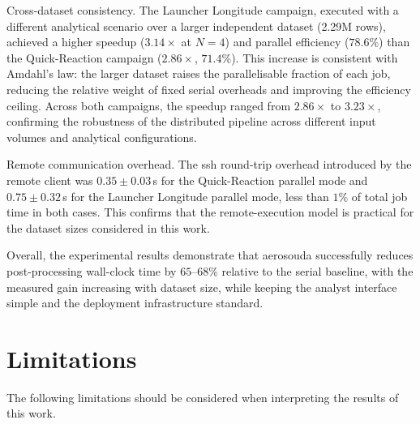 Cross-dataset consistency.
The Launcher Longitude campaign, executed with a different analytical scenario over a larger
independent dataset (2.29M rows), achieved a higher speedup ($3.14\times$ at $N=4$) and
parallel efficiency ($78.6\%$) than the Quick-Reaction campaign ($2.86\times$, $71.4\%$).
This increase is consistent with Amdahl's law: the larger dataset raises the parallelisable
fraction of each job, reducing the relative weight of fixed serial overheads and improving
the efficiency ceiling.  Across both campaigns, the speedup ranged from $2.86\times$ to
$3.23\times$, confirming the robustness of the distributed pipeline across different input
volumes and analytical configurations.

Remote communication overhead.
The \gls{ssh} round-trip overhead introduced by the remote client was $0.35 \pm 0.03$\,s
for the Quick-Reaction parallel mode and $0.75 \pm 0.32$\,s for the Launcher Longitude
parallel mode, less than $1\%$ of total job time in both cases.  This confirms that the
remote-execution model is practical for the dataset sizes considered in this work.

Overall, the experimental results demonstrate that \gls{aerosouda} successfully reduces
post-processing wall-clock time by $65$--$68\%$ relative to the serial baseline, with the
measured gain increasing with dataset size, while keeping the analyst interface simple and
the deployment infrastructure standard.

\section{Limitations}
\label{sec:conc-limitations}

The following limitations should be considered when interpreting the results of this work.

